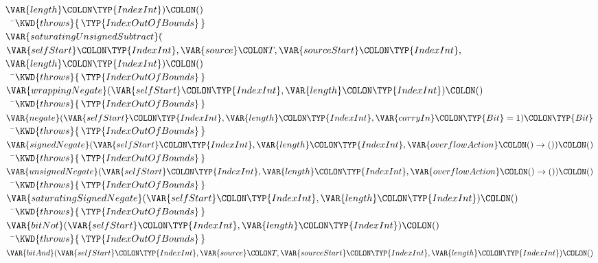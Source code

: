 \begin{Fortress}
\(                           \VAR{length}\COLON \TYP{IndexInt})\COLON ()\)\-\\\poptabs
{\tt~~}\pushtabs\=\+\(    \KWD{throws} \{\,\TYP{IndexOutOfBounds}\,\}\)\-\\\poptabs
\(  \VAR{saturatingUnsignedSubtract}(\null\)\pushtabs\=\+\(\VAR{selfStart}\COLON \TYP{IndexInt}, \VAR{source}\COLON T, \VAR{sourceStart}\COLON \TYP{IndexInt},\)\\
\(                             \VAR{length}\COLON \TYP{IndexInt})\COLON ()\)\-\\\poptabs
{\tt~~}\pushtabs\=\+\(    \KWD{throws} \{\,\TYP{IndexOutOfBounds}\,\}\)\-\\\poptabs
\(  \VAR{wrappingNegate}(\VAR{selfStart}\COLON \TYP{IndexInt}, \VAR{length}\COLON \TYP{IndexInt})\COLON ()\)\\
{\tt~~}\pushtabs\=\+\(    \KWD{throws} \{\,\TYP{IndexOutOfBounds}\,\}\)\-\\\poptabs
\(  \VAR{negate}(\VAR{selfStart}\COLON \TYP{IndexInt}, \VAR{length}\COLON \TYP{IndexInt}, \VAR{carryIn}\COLON \TYP{Bit}=1)\COLON \TYP{Bit}\)\\
{\tt~~}\pushtabs\=\+\(    \KWD{throws} \{\,\TYP{IndexOutOfBounds}\,\}\)\-\\\poptabs
\(  \VAR{signedNegate}(\VAR{selfStart}\COLON \TYP{IndexInt}, \VAR{length}\COLON \TYP{IndexInt}, \VAR{overflowAction}\COLON ()\rightarrow())\COLON ()\)\\
{\tt~~}\pushtabs\=\+\(    \KWD{throws} \{\,\TYP{IndexOutOfBounds}\,\}\)\-\\\poptabs
\(  \VAR{unsignedNegate}(\VAR{selfStart}\COLON \TYP{IndexInt}, \VAR{length}\COLON \TYP{IndexInt}, \VAR{overflowAction}\COLON ()\rightarrow())\COLON ()\)\\
{\tt~~}\pushtabs\=\+\(    \KWD{throws} \{\,\TYP{IndexOutOfBounds}\,\}\)\-\\\poptabs
\(  \VAR{saturatingSignedNegate}(\VAR{selfStart}\COLON \TYP{IndexInt}, \VAR{length}\COLON \TYP{IndexInt})\COLON ()\)\\
{\tt~~}\pushtabs\=\+\(    \KWD{throws} \{\,\TYP{IndexOutOfBounds}\,\}\)\-\\\poptabs
\(  \VAR{bitNot}(\VAR{selfStart}\COLON \TYP{IndexInt}, \VAR{length}\COLON \TYP{IndexInt})\COLON ()\)\\
{\tt~~}\pushtabs\=\+\(    \KWD{throws} \{\,\TYP{IndexOutOfBounds}\,\}\)\-\\\poptabs
\(  \VAR{bitAnd}(\VAR{selfStart}\COLON \TYP{IndexInt}, \VAR{source}\COLON T, \VAR{sourceStart}\COLON \TYP{IndexInt}, \VAR{length}\COLON \TYP{IndexInt})\COLON ()\)\\

\end{Fortress}
